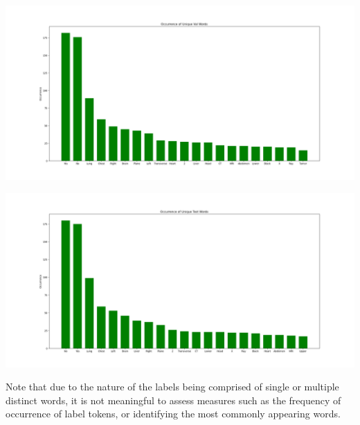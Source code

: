 \documentclass{adonis}
\begin{document}
    \begin{center}
         \hspace*{-1.5cm}\includegraphics[width=15cm]{images/val_unique_words.png}
\end{center}


    \begin{center}
         \hspace*{-1.5cm} \includegraphics[width=15cm]{images/test_unique_words.png}
\end{center}

Note that due to the nature of the labels being comprised of single or multiple distinct words, it is not meaningful to assess measures such as the frequency of occurrence of label tokens, or identifying the most commonly appearing words.



 
	
		
\end{document}
